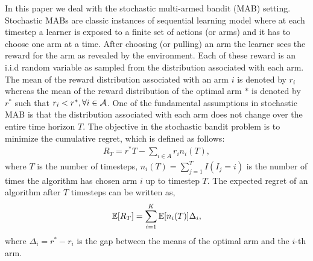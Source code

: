 In this paper we deal with the stochastic multi-armed bandit (MAB) setting. Stochastic MABs are classic instances of sequential learning model where at each timestep a learner is exposed to a finite set of actions (or arms) and it has to choose one arm at a time. After choosing (or pulling) an arm the learner sees the reward for the arm as revealed by the environment. Each of these reward is an i.i.d random variable as sampled from the distribution associated with each arm. The mean of the reward distribution associated with an arm $i$ is denoted by $r_i$ whereas the mean of the reward distribution of the optimal arm $*$ is denoted by $r^*$ such that $r_i < r^*, \forall i\in \mathcal{A}$. One of the fundamental assumptions in stochastic MAB is that the distribution associated with each arm does not change over the entire time horizon $T$. The objective in the stochastic bandit problem is to minimize the cumulative regret, which is defined as follows:
\begin{align*}
R_{T}=r^{*}T - \sum_{i\in A} r_{i}n_{i}(T),
\end{align*}
where $T$ is the number of timesteps, $n_{i}(T)=\sum_{j=1}^T I(I_j=i)$ is the number of times the algorithm has chosen arm $i$ up to timestep $T$.
The expected regret of an algorithm after $T$ timesteps can be written as,
\begin{align*}
\mathbb{E}[R_{T}]= \sum_{i=1}^K \mathbb{E}[n_i (T)] \Delta_i,
\end{align*}
where $\Delta_{i}=r^{*}-r_{i}$ is the gap between the means of the optimal arm and the $i$-th arm.